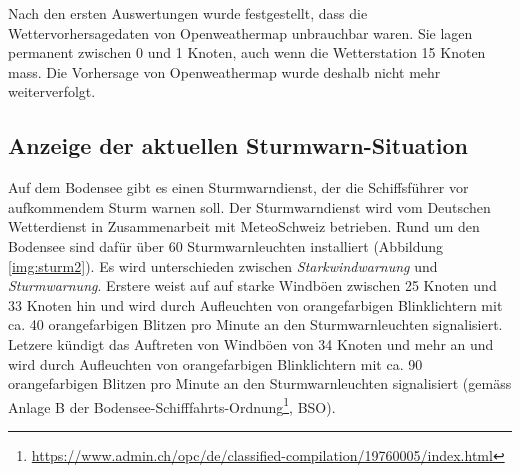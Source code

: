 Nach den ersten Auswertungen wurde festgestellt, dass die Wettervorhersagedaten von Openweathermap unbrauchbar waren. Sie lagen permanent zwischen 0 und 1 Knoten, auch wenn die Wetterstation 15 Knoten mass. Die Vorhersage von Openweathermap wurde deshalb nicht mehr weiterverfolgt.





\subsection{Anzeige der aktuellen Sturmwarn-Situation}
\label{subsec:sturmwarnung}

Auf dem Bodensee gibt es einen Sturmwarndienst, der die Schiffsführer vor aufkommendem Sturm warnen soll. Der Sturmwarndienst wird vom Deutschen Wetterdienst in Zusammenarbeit mit MeteoSchweiz betrieben. Rund um den Bodensee sind dafür über 60 Sturmwarnleuchten installiert (Abbildung \ref{img:sturm2}). Es wird unterschieden zwischen \textit{Starkwindwarnung} und \textit{Sturmwarnung}. Erstere weist auf auf starke Windböen zwischen 25 Knoten und 33 Knoten hin und wird durch Aufleuchten von orangefarbigen Blinklichtern mit ca. 40 orangefarbigen Blitzen pro Minute an den Sturmwarnleuchten signalisiert. Letzere kündigt das Auftreten von Windböen von 34 Knoten und mehr an und wird durch Aufleuchten von orangefarbigen Blinklichtern mit ca. 90 orangefarbigen Blitzen pro Minute an den Sturmwarnleuchten signalisiert (gemäss Anlage B der Bodensee-Schifffahrts-Ordnung\footnote{ \url{https://www.admin.ch/opc/de/classified-compilation/19760005/index.html}}, BSO).

